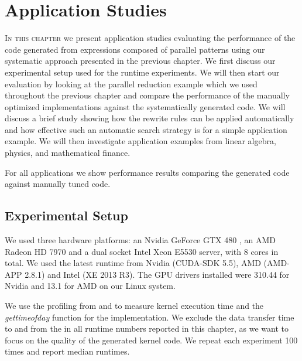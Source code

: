 
\chapter{Application Studies}
\label{ch:sixth} %
\label{chapter:codeGeneration-evaluation}
%
%

\lettrine[lines=3, loversize=0.1]{I}{n this chapter} we present application studies evaluating the performance of the \OpenCL code generated from expressions composed of parallel patterns using our systematic approach presented in the previous chapter.
We first discuss our experimental setup used for the runtime experiments.
We will then start our evaluation by looking at the parallel reduction example which we used throughout the previous chapter and compare the performance of the manually optimized \OpenCL implementations against the systematically generated code.
We will discuss a brief study showing how the rewrite rules can be applied automatically and how effective such an automatic search strategy is for a simple application example.
We will then investigate application examples from linear algebra, physics, and mathematical finance.

For all applications we show performance results comparing the generated \OpenCL code against manually tuned \OpenCL code.

\section{Experimental Setup}
We used three hardware platforms: an Nvidia GeForce GTX 480 \GPU, an AMD Radeon HD 7970 \GPU and a dual socket Intel Xeon E5530 server, with 8 cores in total.
We used the latest \OpenCL runtime from Nvidia (CUDA-SDK 5.5), AMD (AMD-APP 2.8.1) and Intel (XE 2013 R3).
The GPU drivers installed were 310.44 for Nvidia and 13.1 for AMD on our Linux system.

We use the profiling \APIs from \OpenCL and \CUDA to measure kernel execution time and the \textit{gettimeofday} function for the \CPU implementation.
We exclude the data transfer time to and from the \GPU in all runtime numbers reported in this chapter, as we want to focus on the quality of the generated \OpenCL kernel code.
We repeat each experiment 100 times and report median runtimes.




